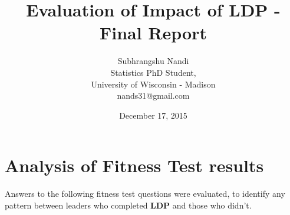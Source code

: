\documentclass[11pt]{extarticle} %
\begin{document}

\title{Evaluation of Impact of LDP - Final Report}
\author{Subhrangshu Nandi\\
  Statistics PhD Student, \\
  University of Wisconsin - Madison \\
  nands31@gmail.com}
\date{December 17, 2015}

\maketitle
\newpage

\tableofcontents
\newpage
\section{Analysis of Fitness Test results}
Answers to the following fitness test questions were evaluated, to identify any pattern between leaders who completed {\bf{LDP}} and those who didn't. 
\end{document}
